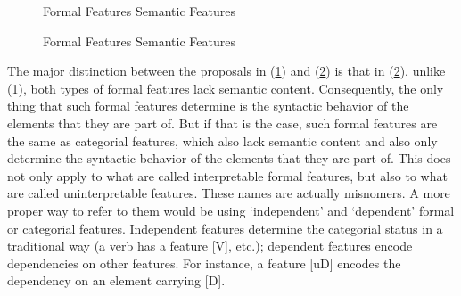 \documentclass[output=paper
,modfonts
,nonflat]{langsci/langscibook}
\begin{document}
\begin{figure}[!h]
\begin{exe}
\ex \hspace{1.5cm} Formal Features \hspace{0.8cm} Semantic Features \label{ex-zeijlstra:10} \\
\end{exe} \vspace{-0.5cm}
\end{figure}
\begin{figure}[!h]
\begin{exe}
\ex \hspace{1.5cm} Formal Features \hspace{2.5cm} Semantic Features \label{ex-zeijlstra:11}\\ 
\end{exe} \vspace{-0.8cm}
\end{figure}
\newpage \noindent The major distinction between the proposals in (\ref{ex-zeijlstra:10}) and (\ref{ex-zeijlstra:11}) is that in (\ref{ex-zeijlstra:11}), unlike (\ref{ex-zeijlstra:10}), both types of formal features lack semantic content. Consequently, the only thing that such formal features determine is the syntactic behavior of the elements that they are part of. But if that is the case, such formal features are the same as categorial features, which also lack semantic content and also only determine the syntactic behavior of the elements that they are part of. This does not only apply to what are called interpretable formal features, but also to what are called uninterpretable features. These names are actually misnomers. A more proper way to refer to them would be using ‘independent’ and ‘dependent’ formal or categorial features. Independent features determine the categorial status in a traditional way (a verb has a feature [V], etc.); dependent features encode dependencies on other features. For instance, a feature [uD] encodes the dependency on an element carrying [D].
\end{document}
